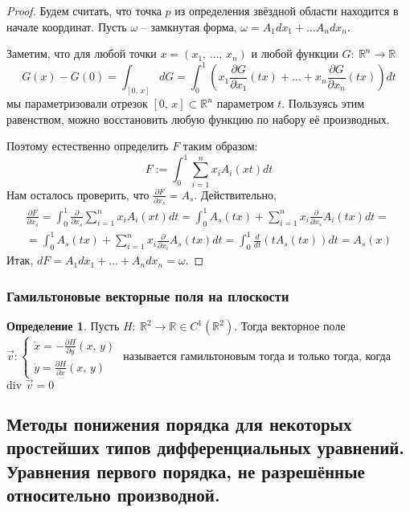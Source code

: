 \documentclass[a4paper,12pt]{article}
\theoremstyle{plain}
\theoremstyle{definition}
\newtheorem{definition}{Определение}[section]
\theoremstyle{remark}
\begin{document}
\begin{proof}
	Будем считать, что точка $p$ из определения звёздной области находится в начале координат. Пусть $\omega$ -- замкнутая форма, $\omega = A_1dx_1 + \ldots A_ndx_n$.

	Заметим, что для любой точки $x = (x_1,\,\ldots,\,x_n)$ и любой функции $G:\: \mathbb{R}^n \to \mathbb{R}$
	\[G(x) - G(0) = \int_{[0,\,x]}dG = \int_0^1\left(x_1\frac{\partial G}{\partial x_1}(tx) + \ldots + x_n\frac{\partial G}{\partial x_n}(tx)\right)dt\]
	мы параметризовали отрезок $[0,\,x] \subset \mathbb{R}^n$ параметром $t$. Пользуясь этим равенством, можно восстановить любую функцию по набору её производных.

	Поэтому естественно определить $F$ таким образом:
	\[F := \int_0^1 \sum_{i = 1}^n x_iA_i(xt)dt\]
	Нам осталось проверить, что $\frac{\partial F}{\partial x_s} = A_s$. Действительно,
	\begin{align*}
		\frac{\partial F}{\partial x_s} = \int_0^1 \frac{\partial}{\partial x_s} \sum_{i = 1}^n x_iA_i(xt)dt = \int_0^1 A_s(tx) + \sum_{i = 1}^n x_i \frac{\partial}{\partial x_s}A_i(tx)dt = \\
		= \int_0^1 A_s(tx) + \sum_{i = 1}^n x_i \frac{\partial}{\partial x_i}A_s(tx)dt = \int_0^1 \frac{d}{dt}(tA_s(tx))dt = A_s(x)
	\end{align*}
	Итак, $dF = A_1dx_1 + \ldots + A_ndx_n = \omega$.
\end{proof}

\subsubsection*{Гамильтоновые векторные поля на плоскости}
\begin{definition}
	Пусть $H:\: \mathbb{R}^2 \to \mathbb{R} \in C^1(\mathbb{R}^2)$. Тогда векторное поле
	$\vec{v}: \begin{cases}
			\dot{x} = -\frac{\partial H}{\partial y}(x,\,y) \\
			\dot{y} = \frac{\partial H}{\partial x}(x,\,y)
		\end{cases}$ называется гамильтоновым тогда и только тогда, когда $\text{div }\vec{v} = 0$
\end{definition}

\subsection{Методы понижения порядка для некоторых простейших типов дифференциальных уравнений. Уравнения первого порядка, не разрешённые относительно производной.}
\end{document}
